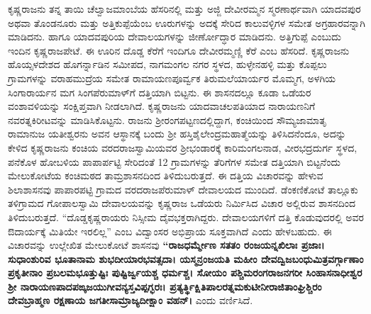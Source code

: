 ಕೃಷ್ಣರಾಜನು ತನ್ನ ತಾಯಿ ಚೆಲ್ವಾಜಮಾಂಬೆಯ ಹೆಸರಿನಲ್ಲಿ ಮತ್ತು ಅಜ್ಜಿ ದೇವೀರಮ್ಮನ ಸ್ಮರಣಾರ್ಥವಾಗಿ ಯಾದವಪುರ ಅಥವಾ ತೊಂಡನೂರು ಮತ್ತು ಅತ್ತಿಕುಪ್ಪೆಯೆಂಬ ಊರುಗಳನ್ನು ಅದಕ್ಕೆ ಸೇರಿದ ಕಾಲುವಳ್ಳಿಗಳ ಸಮೇತ ಅಗ್ರಹಾರವನ್ನಾಗಿ ಮಾಡಿದನು. ಹಾಗೂ ಯಾದವಪುರಿಯ ದೇವಾಲಯಗಳನ್ನು ಜೀರ್ಣೋದ್ಧಾರ ಮಾಡಿದನು. ಅತ್ತಿಗುಪ್ಪೆ ಎಂಬುದು ಇಂದಿನ ಕೃಷ್ಣರಾಜಪೇಟೆ. ಈ ಊರಿನ ದೊಡ್ಡ ಕೆರೆಗೆ ಇಂದಿಗೂ ದೇವೀರಮ್ಮಣ್ಣಿ ಕೆರೆ ಎಂಬ ಹೆಸರಿದೆ. ಕೃಷ್ಣರಾಜನು ಹೊಯ್ಸಳದೇಶದ ಹೊಗರ್ನ್ನಾಡಿನ ಸಮೀಪದ, ನಾಗಮಂಗಲ ನಗರ ಸ್ಥಳದ, ಹುಳ್ಳೇನಹಳ್ಳಿ ಮತ್ತು ಕೊಪ್ಪಲು ಗ್ರಾಮಗಳನ್ನು ವರಾಹಮುದ್ರೆಯ ಸಮೇತ ರಾಮಾಯಣಪೂರ್ವ್ವಕ ತಿರುಮಲೆಯಾರ್ಯರ ಮೊಮ್ಮಗ, ಅಳಗಿಯ ಸಿಂಗಾರಾರ್ಯನ ಮಗ ಸಿಂಗಪೆರುಮಾಳ್​ಗೆ ದತ್ತಿಯಾಗಿ ಬಿಟ್ಟನು. ಈ ಶಾಸನದಲ್ಲೂ ಕೂಡಾ ಒಡೆಯರ ವಂಶಾವಳಿಯನ್ನು ಸಂಕ್ಷಿಪ್ತವಾಗಿ ನೀಡಲಾಗಿದೆ. ಕೃಷ್ಣರಾಜನು ಯಾದವಾಚಲಪತಿಯಾದ ನಾರಾಯಣನಿಗೆ ನವರತ್ನಕಿರೀಟವನ್ನು ಮಾಡಿಸಿಕೊಟ್ಟನು. ರಾಜನು ಶ‍್ರೀರಂಗಪಟ್ಟಣದಲ್ಲಿದ್ದಾಗ, ಕಂಚಿಯಿಂದ ಸೌಮ್ಯಜಾಮಾತೃ ರಾಮಾನುಜ ಯತೀಶ್ವರನು ಅವನ ಆಸ್ಥಾನಕ್ಕೆ ಬಂದು ಶ‍್ರೀ ಹಸ್ತಿಶೈಲೇಂದ್ರಮಹಾತ್ಮೆಯನ್ನು ತಿಳಿಸಿದನೆಂದೂ, ಅದನ್ನು ಕೇಳಿದ ಕೃಷ್ಣರಾಜನು ಕಂಚಿಯ ವರದರಾಜಸ್ವಾಮಿಯವರ ಶ‍್ರೀಭಂಡಾರಕ್ಕೆ ಕಾರಿಮಂಗಲನಾಡ, ವೀರಭದ್ರದುರ್ಗ ಸ್ಥಳದ, ಪನೆಕೊಳ ಹೋಬಳಿಯ ಪಾಪಾರ್ಪಟ್ಟಿ ಸೇರಿದಂತೆ 12 ಗ್ರಾಮಗಳನ್ನು ತೆರಿಗೆಗಳ ಸಮೇತ ದತ್ತಿಯಾಗಿ ಬಿಟ್ಟನೆಂದು ಮೇಲುಕೋಟೆಯ ಕಂಚಿಮಠದ ತಾಮ್ರಶಾಸನದಿಂದ ತಿಳಿದುಬರುತ್ತದೆ. ಈ ದತ್ತಿಯ ವಿಚಾರವನ್ನು ಹೇಳುವ ಶಿಲಾಶಾಸನವು ಪಾಪಾರಪಟ್ಟಿ ಗ್ರಾಮದ ವರದರಾಜಪೆರುಮಾಳ್​ ದೇವಾಲಯದ ಮುಂದಿದೆ. ಡೆಂಕಣಿಕೋಟೆ ತಾಲ್ಲೂಕು ತಳಿಗ್ರಾಮದ ಗೋಪಾಲಸ್ವಾಮಿ ದೇವಾಲಯವನ್ನು ಕೃಷ್ಣರಾಜ ಒಡೆಯರು ನಿರ್ಮಿಸಿದ ವಿಚಾರ ಅಲ್ಲಿರುವ ಶಾಸನದಿಂದ ತಿಳಿದುಬರುತ್ತದೆ. “ದೊಡ್ಡಕೃಷ್ಣರಾಯರು ನಿಸ್ಸೀಮ ದೈವಭಕ್ತರಾಗಿದ್ದರು. ದೇವಾಲಯಗಳಿಗೆ ದತ್ತಿ ಕೊಡುವುದರಲ್ಲಿ ಅವರ ಔದಾರ್ಯಕ್ಕೆ ಮಿತಿಯೇ ಇರಲಿಲ್ಲ” ಎಂಬ ವಿದ್ವಾಂಸರ ಅಭಿಪ್ರಾಯ ಸೂಕ್ತವಾಗಿದೆ ಎಂದು ಹೇಳಬಹುದು. ಈ ವಿಚಾರವನ್ನು ಉಲ್ಲೇಖಿತ ಮೇಲುಕೋಟೆ ಶಾಸನವು \textbf{“ರಾಜಧರ್ಮ್ಮೇಣ ಸತತಂ ರಂಜಯನ್ನಖಿಲಾಃ ಪ್ರಜಾಃ। ಸುಧಾಂಶುರಿವ\general{\break } ಭೂತಾನಾಮ ಶುಭದೀಯಾರಭವತ್ಸದಾ। ಯಸ್ಮನ್ರಂಜಯತಿ ಮಹೀಂ ದೇವದ್ವಿಜಬಂಧುಮಿತ್ರವರ್ಗ್ಗಾಣಾಂ ಪ್ರಕೃತೀನಾಂ\general{\break } ಪ್ರಬಲಮಭೂತ್ತುಷ್ಟಿಃ ಪುಷ್ಟಿರ್ಜ್ವಯಶ್ಚ ಧರ್ಮಶ್ಚ। ಸೋಯಂ ಪಶ್ಚಿಮರಂಗರಾಜನಗರೀ ಸಿಂಹಾಸನಾಧೀಶ್ವರ\general{\break } ಶ‍್ರೀ ನಾರಾಯಣಪಾದಪಙ್ಕಜಯುಗೀವನ್ಯಸ್ತವಿಪ್ಪಗ್ಭರಃ। ಪ್ರತ್ಯರ್ತ್ಥಿಕ್ಷಿತಿಪಾಲರತ್ನಮಕುಟೀನೀರಾಜಿತಾಂಘ್ರಿಶ್ಚಿರಂ ದೇವಬ್ರಾಹ್ಮಣ ರಕ್ಷಣಾಯ ಜಗತೀಸಾಮ್ರಾಜ್ಯದೀಕ್ಷಾಂ ವಹನ್​। } ಎಂದು ವರ್ಣಿಸಿದೆ.

